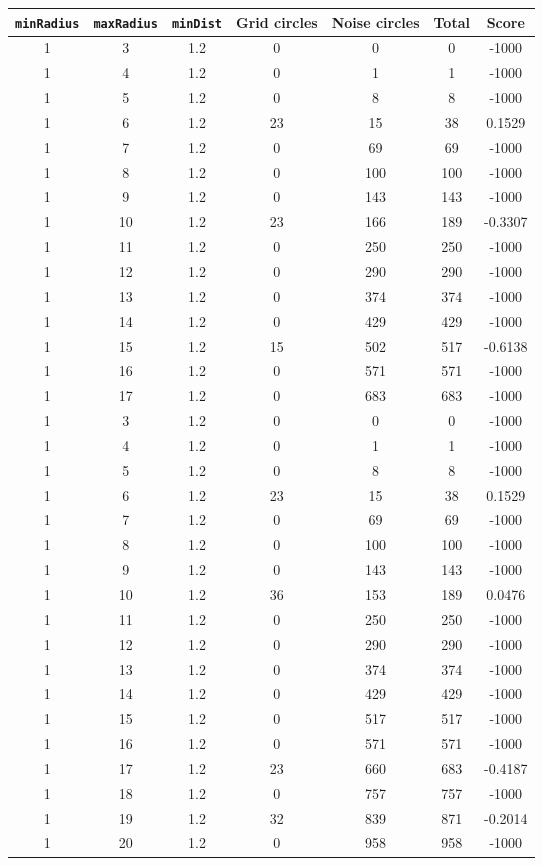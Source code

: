 \documentclass[letterpaper, 12pt]{article}
\begin{document}
\begin{longtable}{|c|c|c|c|c|c|c|}
\hline
\textbf{\texttt{minRadius}} & \textbf{\texttt{maxRadius}} & \textbf{\texttt{minDist}} & \textbf{Grid circles} & \textbf{Noise circles} & \textbf{Total} & \textbf{Score} \\
\hline
1 & 3 & 1.2 & 0 & 0 & 0 & -1000 \\
\hline
1 & 4 & 1.2 & 0 & 1 & 1 & -1000 \\
\hline
1 & 5 & 1.2 & 0 & 8 & 8 & -1000 \\
\hline
1 & 6 & 1.2 & 23 & 15 & 38 & 0.1529 \\
\hline
1 & 7 & 1.2 & 0 & 69 & 69 & -1000 \\
\hline
1 & 8 & 1.2 & 0 & 100 & 100 & -1000 \\
\hline
1 & 9 & 1.2 & 0 & 143 & 143 & -1000 \\
\hline
1 & 10 & 1.2 & 23 & 166 & 189 & -0.3307 \\
\hline
1 & 11 & 1.2 & 0 & 250 & 250 & -1000 \\
\hline
1 & 12 & 1.2 & 0 & 290 & 290 & -1000 \\
\hline
1 & 13 & 1.2 & 0 & 374 & 374 & -1000 \\
\hline
1 & 14 & 1.2 & 0 & 429 & 429 & -1000 \\
\hline
1 & 15 & 1.2 & 15 & 502 & 517 & -0.6138 \\
\hline
1 & 16 & 1.2 & 0 & 571 & 571 & -1000 \\
\hline
1 & 17 & 1.2 & 0 & 683 & 683 & -1000 \\
\hline
1 & 3 & 1.2 & 0 & 0 & 0 & -1000 \\
\hline
1 & 4 & 1.2 & 0 & 1 & 1 & -1000 \\
\hline
1 & 5 & 1.2 & 0 & 8 & 8 & -1000 \\
\hline
1 & 6 & 1.2 & 23 & 15 & 38 & 0.1529 \\
\hline
1 & 7 & 1.2 & 0 & 69 & 69 & -1000 \\
\hline
1 & 8 & 1.2 & 0 & 100 & 100 & -1000 \\
\hline
1 & 9 & 1.2 & 0 & 143 & 143 & -1000 \\
\hline
1 & 10 & 1.2 & 36 & 153 & 189 & 0.0476 \\
\hline
1 & 11 & 1.2 & 0 & 250 & 250 & -1000 \\
\hline
1 & 12 & 1.2 & 0 & 290 & 290 & -1000 \\
\hline
1 & 13 & 1.2 & 0 & 374 & 374 & -1000 \\
\hline
1 & 14 & 1.2 & 0 & 429 & 429 & -1000 \\
\hline
1 & 15 & 1.2 & 0 & 517 & 517 & -1000 \\
\hline
1 & 16 & 1.2 & 0 & 571 & 571 & -1000 \\
\hline
1 & 17 & 1.2 & 23 & 660 & 683 & -0.4187 \\
\hline
1 & 18 & 1.2 & 0 & 757 & 757 & -1000 \\
\hline
1 & 19 & 1.2 & 32 & 839 & 871 & -0.2014 \\
\hline
1 & 20 & 1.2 & 0 & 958 & 958 & -1000 \\
\hline
\end{longtable}
\end{document}
